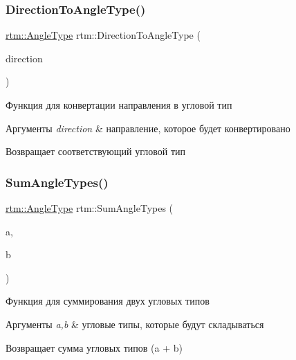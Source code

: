 \subsubsection{\texorpdfstring{Direction\+To\+Angle\+Type()}{DirectionToAngleType()}}
{\footnotesize\ttfamily \hyperlink{namespacertm_a69dc82b16a0148c10962caa83d930f89}{rtm\+::\+Angle\+Type} rtm\+::\+Direction\+To\+Angle\+Type (\begin{DoxyParamCaption}\item[{\hyperlink{namespacertm_a57b216f3aeb45041f3461bab08bc3aeb}{Direction\+Type}}]{direction }\end{DoxyParamCaption})}

Функция для конвертации направления в угловой тип 
\begin{DoxyParams}{Аргументы}
{\em direction} & направление, которое будет конвертировано \\
\hline
\end{DoxyParams}
\begin{DoxyReturn}{Возвращает}
соответствующий угловой тип 
\end{DoxyReturn}
\mbox{\label{namespacertm_ac1ea2821fc44943e5c35d92e0c9cd5de}} 
\subsubsection{\texorpdfstring{Sum\+Angle\+Types()}{SumAngleTypes()}}
{\footnotesize\ttfamily \hyperlink{namespacertm_a69dc82b16a0148c10962caa83d930f89}{rtm\+::\+Angle\+Type} rtm\+::\+Sum\+Angle\+Types (\begin{DoxyParamCaption}\item[{\hyperlink{namespacertm_a69dc82b16a0148c10962caa83d930f89}{Angle\+Type}}]{a,  }\item[{\hyperlink{namespacertm_a69dc82b16a0148c10962caa83d930f89}{Angle\+Type}}]{b }\end{DoxyParamCaption})}

Функция для суммирования двух угловых типов 
\begin{DoxyParams}{Аргументы}
{\em a,b} & угловые типы, которые будут складываться \\
\hline
\end{DoxyParams}
\begin{DoxyReturn}{Возвращает}
сумма угловых типов (a + b) 
\end{DoxyReturn}
\mbox{\label{namespacertm_a37715773d85c66ba5c1bf11260836fd0}} 
